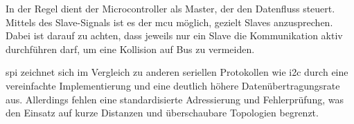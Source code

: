 In der Regel dient der Microcontroller als Master, der den Datenfluss steuert.
Mittels des Slave-Signals ist es der \gls{mcu} möglich, gezielt Slaves anzusprechen.
Dabei ist darauf zu achten, dass jeweils nur ein Slave die Kommunikation aktiv durchführen darf, um eine Kollision auf Bus zu vermeiden.

\gls{spi} zeichnet sich im Vergleich zu anderen seriellen Protokollen wie \gls{i2c} durch eine vereinfachte Implementierung und eine deutlich höhere Datenübertragungsrate aus. 
Allerdings fehlen eine standardisierte Adressierung und Fehlerprüfung, was den Einsatz auf kurze Distanzen und überschaubare Topologien begrenzt. 

% 
